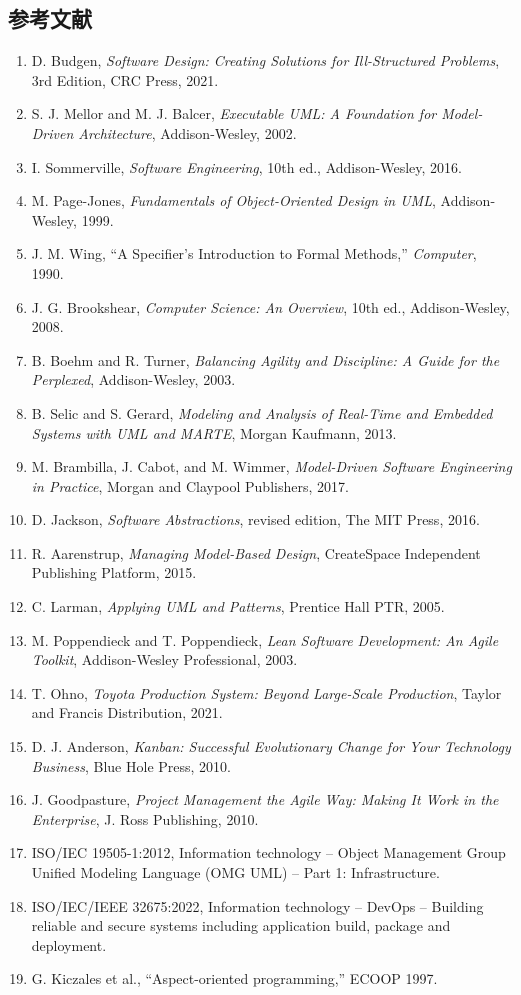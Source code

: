 \documentclass[a4paper,11pt]{ltjsarticle}
\numberwithin{figure}{section}
\numberwithin{table}{section}
\begin{document}
\subsection{参考文献}
\begin{enumerate}
  \item D. Budgen, \textit{Software Design: Creating Solutions for Ill-Structured Problems}, 3rd Edition, CRC Press, 2021.
  \item S. J. Mellor and M. J. Balcer, \textit{Executable UML: A Foundation for Model-Driven Architecture}, Addison-Wesley, 2002.
  \item I. Sommerville, \textit{Software Engineering}, 10th ed., Addison-Wesley, 2016.
  \item M. Page-Jones, \textit{Fundamentals of Object-Oriented Design in UML}, Addison-Wesley, 1999.
  \item J. M. Wing, ``A Specifier's Introduction to Formal Methods,'' \textit{Computer}, 1990.
  \item J. G. Brookshear, \textit{Computer Science: An Overview}, 10th ed., Addison-Wesley, 2008.
  \item B. Boehm and R. Turner, \textit{Balancing Agility and Discipline: A Guide for the Perplexed}, Addison-Wesley, 2003.
  \item B. Selic and S. Gerard, \textit{Modeling and Analysis of Real-Time and Embedded Systems with UML and MARTE}, Morgan Kaufmann, 2013.
  \item M. Brambilla, J. Cabot, and M. Wimmer, \textit{Model-Driven Software Engineering in Practice}, Morgan and Claypool Publishers, 2017.
  \item D. Jackson, \textit{Software Abstractions}, revised edition, The MIT Press, 2016.
  \item R. Aarenstrup, \textit{Managing Model-Based Design}, CreateSpace Independent Publishing Platform, 2015.
  \item C. Larman, \textit{Applying UML and Patterns}, Prentice Hall PTR, 2005.
  \item M. Poppendieck and T. Poppendieck, \textit{Lean Software Development: An Agile Toolkit}, Addison-Wesley Professional, 2003.
  \item T. Ohno, \textit{Toyota Production System: Beyond Large-Scale Production}, Taylor and Francis Distribution, 2021.
  \item D. J. Anderson, \textit{Kanban: Successful Evolutionary Change for Your Technology Business}, Blue Hole Press, 2010.
  \item J. Goodpasture, \textit{Project Management the Agile Way: Making It Work in the Enterprise}, J. Ross Publishing, 2010.
  \item ISO/IEC 19505-1:2012, Information technology -- Object Management Group Unified Modeling Language (OMG UML) -- Part 1: Infrastructure.
  \item ISO/IEC/IEEE 32675:2022, Information technology -- DevOps -- Building reliable and secure systems including application build, package and deployment.
  \item G. Kiczales et al., ``Aspect-oriented programming,'' ECOOP 1997.
\end{enumerate}
\end{document}
